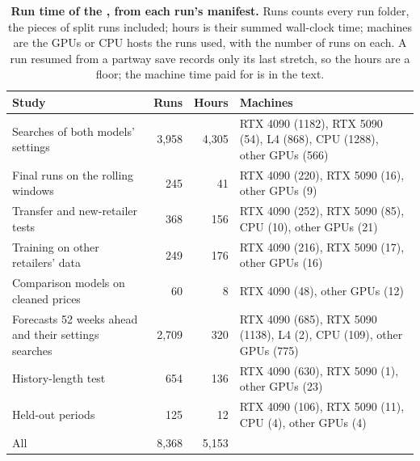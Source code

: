 \begin{table}[t]
\centering
\caption{\textbf{Run time of the \revn{}, from each run's manifest.} Runs counts every run folder, the pieces of
split runs included; hours is their summed wall-clock time; machines are the GPUs or CPU hosts the runs used, with the
number of runs on each. A run resumed from a partway save records only its last stretch, so the hours are a floor;
the machine time paid for is in the text.}
\label{tab:compute-revision}
\footnotesize
\setlength{\tabcolsep}{3pt}
\begin{tabular}{p{}rrp{}}
\toprule
\textbf{Study} & \textbf{Runs} & \textbf{Hours} & \textbf{Machines} \\
\midrule
Searches of both models' settings & 3,958 & 4,305 & RTX 4090 (1182), RTX 5090 (54), L4 (868), CPU (1288), other GPUs (566) \\
Final runs on the rolling windows & 245 & 41 & RTX 4090 (220), RTX 5090 (16), other GPUs (9) \\
Transfer and new-retailer tests & 368 & 156 & RTX 4090 (252), RTX 5090 (85), CPU (10), other GPUs (21) \\
Training on other retailers' data & 249 & 176 & RTX 4090 (216), RTX 5090 (17), other GPUs (16) \\
Comparison models on cleaned prices & 60 & 8 & RTX 4090 (48), other GPUs (12) \\
Forecasts 52 weeks ahead and their settings searches & 2,709 & 320 & RTX 4090 (685), RTX 5090 (1138), L4 (2), CPU (109), other GPUs (775) \\
History-length test & 654 & 136 & RTX 4090 (630), RTX 5090 (1), other GPUs (23) \\
Held-out periods & 125 & 12 & RTX 4090 (106), RTX 5090 (11), CPU (4), other GPUs (4) \\
\midrule
All & 8,368 & 5,153 & \\
\bottomrule
\end{tabular}
\end{table}
